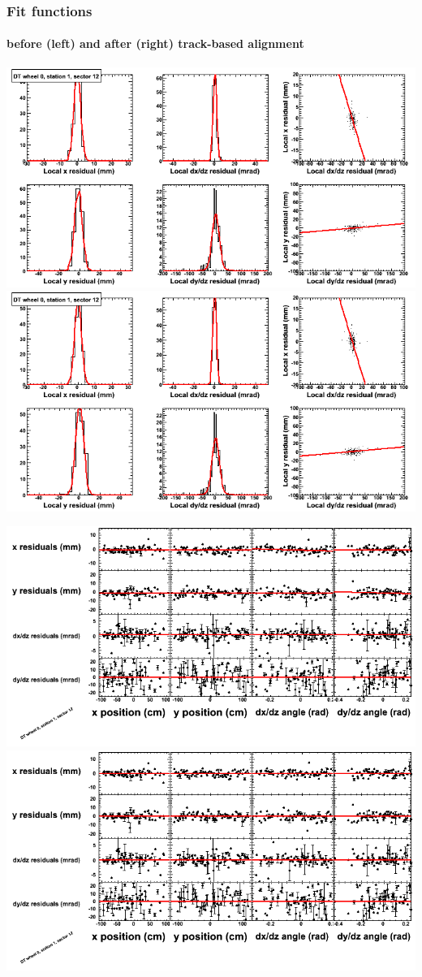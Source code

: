\documentclass[compress]{beamer}
\begin{document}
\begin{frame}
\frametitle{Fit functions}
\framesubtitle{before (left) and after (right) track-based alignment}
\includegraphics[width=0.5\linewidth]{fitfunctions_re01/MBwhCst1sec12_bellcurves.png} \includegraphics[width=0.5\linewidth]{fitfunctions_re05/MBwhCst1sec12_bellcurves.png}

\includegraphics[width=0.5\linewidth]{fitfunctions_re01/MBwhCst1sec12_polynomials.png} \includegraphics[width=0.5\linewidth]{fitfunctions_re05/MBwhCst1sec12_polynomials.png}
\end{frame}
\end{document}
